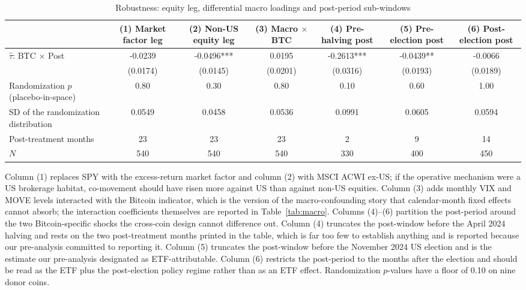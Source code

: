 \begin{table}[t]
\centering
\begin{threeparttable}
\caption{Robustness: equity leg, differential macro loadings and post-period sub-windows}
\label{tab:robustness_spec}
\begin{tabular}{lcccccc}
\toprule
 & (1) Market factor leg & (2) Non-US equity leg & (3) Macro $\times$ BTC & (4) Pre-halving post & (5) Pre-election post & (6) Post-election post \\
\midrule
$\hat\tau$: BTC $\times$ Post & -0.0239 & -0.0496*** & 0.0195 & -0.2613*** & -0.0439** & -0.0066 \\
 & (0.0174) & (0.0145) & (0.0201) & (0.0316) & (0.0193) & (0.0189) \\
Randomization $p$ (placebo-in-space) & 0.80 & 0.30 & 0.80 & 0.10 & 0.60 & 1.00 \\
SD of the randomization distribution & 0.0549 & 0.0458 & 0.0536 & 0.0991 & 0.0605 & 0.0594 \\
Post-treatment months & 23 & 23 & 23 & 2 & 9 & 14 \\
$N$ & 540 & 540 & 540 & 330 & 400 & 450 \\
\bottomrule
\end{tabular}
\begin{tablenotes}[flushleft]
\footnotesize
\item Column (1) replaces SPY with the excess-return market factor and column (2) with MSCI ACWI ex-US; if the operative mechanism were a US brokerage habitat, co-movement should have risen more against US than against non-US equities. Column (3) adds monthly VIX and MOVE levels interacted with the Bitcoin indicator, which is the version of the macro-confounding story that calendar-month fixed effects cannot absorb; the interaction coefficients themselves are reported in Table~\ref{tab:macro}. Columns (4)--(6) partition the post-period around the two Bitcoin-specific shocks the cross-coin design cannot difference out. Column (4) truncates the post-window before the April 2024 halving and rests on the two post-treatment months printed in the table, which is far too few to establish anything and is reported because our pre-analysis committed to reporting it. Column (5) truncates the post-window before the November 2024 US election and is the estimate our pre-analysis designated as ETF-attributable. Column (6) restricts the post-period to the months after the election and should be read as the ETF plus the post-election policy regime rather than as an ETF effect. Randomization $p$-values have a floor of 0.10 on nine donor coins.
\end{tablenotes}
\end{threeparttable}
\end{table}
